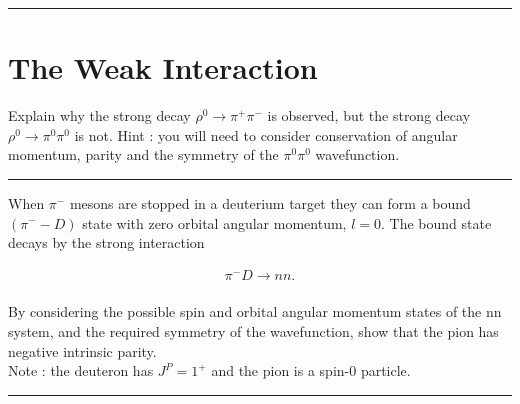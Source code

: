 
\noindent\rule{7in}{2.8pt}
\section{The Weak Interaction}
    
\begin{problem}{11.1}
Explain why the strong decay $\rho^0\to\pi^+\pi^-$ is observed, but the strong decay $\rho^0\to\pi^0\pi^0$ is not.
Hint : you will need to consider conservation of angular momentum, parity and the symmetry of the $\pi^0\pi^0$ wavefunction.
\end{problem}
\begin{solution}

\end{solution}

\noindent\rule{7in}{1.5pt}


\begin{problem}{11.2}
When $\pi^−$ mesons are stopped in a deuterium target they can form a bound $(\pi^--D)$ state with zero orbital angular momentum, $l = 0$. The bound state decays by the strong interaction

\begin{align*}
    \pi^-D\to nn.
\end{align*}\\
By considering the possible spin and orbital angular momentum states of the nn system, and the required symmetry of the wavefunction, show that the pion has negative intrinsic parity.\\

Note : the deuteron has $J^P =1^+$ and the pion is a spin-0 particle.
\end{problem}
\begin{solution}

\end{solution}

\noindent\rule{7in}{1.5pt}


